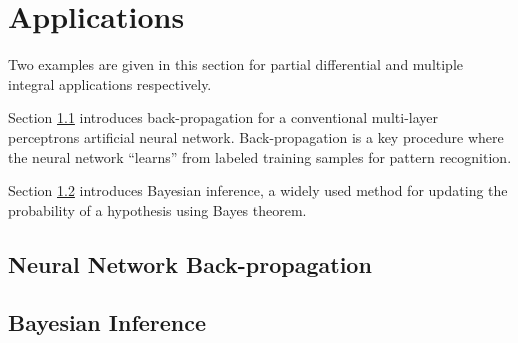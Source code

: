 \chapter{Applications}

Two examples are given in this section for partial differential and multiple integral applications respectively. 

Section \ref{ch8sec:nnbackpropagation} introduces back-propagation for a conventional multi-layer perceptrons artificial neural network. Back-propagation is a key procedure where the neural network ``learns'' from labeled training samples for pattern recognition. 

Section \ref{ch8sec:bayesianinference} introduces Bayesian inference, a widely used method for updating the probability of a hypothesis using Bayes theorem.

\section{Neural Network Back-propagation} \label{ch8sec:nnbackpropagation}

\section{Bayesian Inference} \label{ch8sec:bayesianinference}
